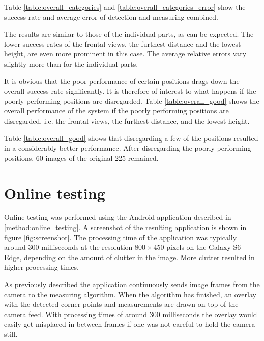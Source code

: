 

Table \ref{table:overall_categories} and \ref{table:overall_categories_error} show the success rate and average error of detection and measuring combined.





The results are similar to those of the individual parts, as can be expected.
The lower success rates of the frontal views, the furthest distance and the lowest height, are even more prominent in this case.
The average relative errors vary slightly more than for the individual parts.

It is obvious that the poor performance of certain positions drags down the overall success rate significantly.
It is therefore of interest to what happens if the poorly performing positions are disregarded.
Table \ref{table:overall_good} shows the overall performance of the system if the poorly performing positions are disregarded, i.e. the frontal views, the furthest distance, and the lowest height.



Table \ref{table:overall_good} shows that disregarding a few of the positions resulted in a considerably better performance.
After disregarding the poorly performing positions, 60 images of the original 225 remained.

\section{Online testing} \label{results:online}

Online testing was performed using the Android application described in \ref{method:online_testing}.
A screenshot of the resulting application is shown in figure \ref{fig:screenshot}.
The processing time of the application was typically around 300 milliseconds at the resolution $800 \times 450$ pixels on the Galaxy S6 Edge, depending on the amount of clutter in the image. 
More clutter resulted in higher processing times.

As previously described the application continuously sends image frames from the camera to the measuring algorithm. 
When the algorithm has finished, an overlay with the detected corner points and measurements are drawn on top of the camera feed.
With processing times of around 300 milliseconds the overlay would easily get misplaced in between frames if one was not careful to hold the camera still. 

